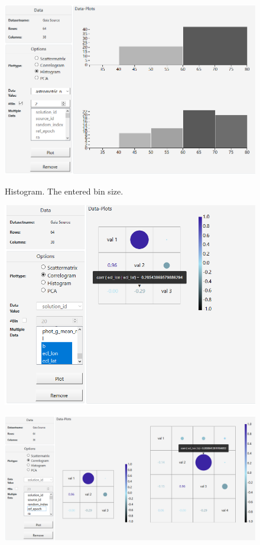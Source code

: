 \documentclass{article}
\begin{document}
\begin{figure}[!h]
\centering
\includegraphics[width=1\textwidth]{images/m3/histogram2.PNG}
\label{fig3}
\caption{Histogram. The entered bin size.}
\end{figure}

\newpage
\begin{figure}[!h]
\centering
\includegraphics[width=1\textwidth]{images/m3/corr1.PNG}
\label{fig4}
\end{figure}

\begin{figure}[!h]
\centering
\includegraphics[width=1\textwidth]{images/m3/corr2.PNG}
\end{figure}
\end{document}
